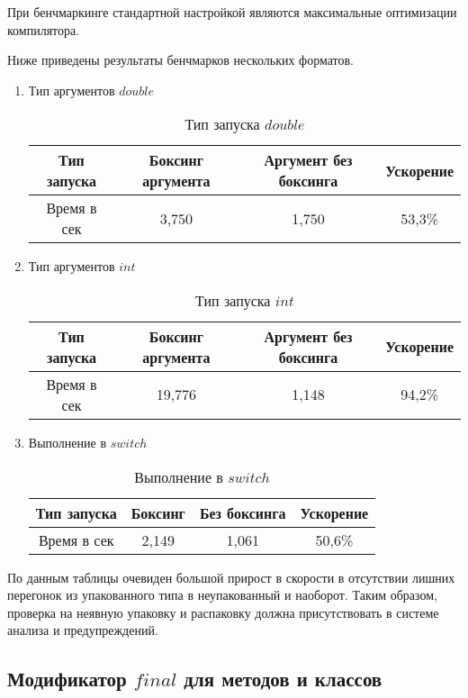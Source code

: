 \documentclass{mipt-thesis-bs}
\begin{document}
При бенчмаркинге стандартной
настройкой являются максимальные оптимизации компилятора.

Ниже приведены результаты бенчмарков нескольких форматов.

\begin{enumerate}
    \item Тип аргументов $double$
\begin{table}[h]
    \centering
    \begin{tabular}{|c|c|c|c|}
      \hline
      Тип запуска & Боксинг аргумента & Аргумент без боксинга & Ускорение \\
      \hline
      Время в сек& 3,750 & 1,750 & 53,3\% \\
      \hline
    \end{tabular}
    \caption{Тип запуска $double$}
  \end{table}

  \item Тип аргументов $int$

\begin{table}[h]
    \centering
    \begin{tabular}{|c|c|c|c|}
      \hline
      Тип запуска & Боксинг аргумента & Аргумент без боксинга & Ускорение \\
      \hline
      Время в сек& 19,776 & 1,148 & 94,2\% \\
      \hline
    \end{tabular}
    \caption{Тип запуска $int$}
  \end{table}

  \item Выполнение в $switch$
  \begin{table}[h]
    \centering
    \begin{tabular}{|c|c|c|c|}
      \hline
      Тип запуска & Боксинг & Без боксинга & Ускорение \\
      \hline
      Время в сек& 2,149 & 1,061 & 50,6\% \\
      \hline
    \end{tabular}
    \caption{Выполнение в $switch$}
  \end{table}
\end{enumerate}

По данным таблицы очевиден большой прирост в скорости в отсутствии
лишних перегонок из упакованного типа в неупакованный и наоборот.
Таким образом, проверка на неявную упаковку и распаковку должна
присутствовать в системе анализа и предупреждений.

\subsection{Модификатор $final$ для методов и классов}
\end{document}
